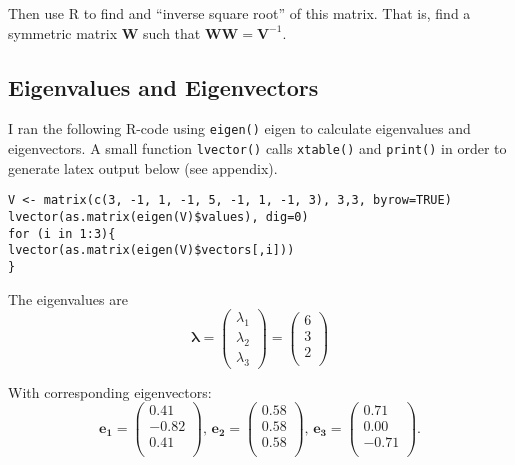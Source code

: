 \documentclass[11pt]{article}
\begin{document}
Then use R to find and ``inverse square root'' of this matrix.
That is, find a symmetric matrix $\mathbf{W}$ such that
$\mathbf{WW}=\mathbf{V}^{-1}$.
\subsection{Eigenvalues and Eigenvectors}
\label{sec-2-1}


I ran the following R-code using \verb~eigen()~ eigen to calculate eigenvalues
and eigenvectors. A small function \verb~lvector()~ calls \verb~xtable()~ and \verb~print()~
in order to generate latex output below (see appendix). 

\begin{verbatim}
V <- matrix(c(3, -1, 1, -1, 5, -1, 1, -1, 3), 3,3, byrow=TRUE)
lvector(as.matrix(eigen(V)$values), dig=0)
for (i in 1:3){
lvector(as.matrix(eigen(V)$vectors[,i]))
}
\end{verbatim}

The eigenvalues are 
\[
\mathbf{\lambda} = \begin{pmatrix} \lambda_1
\\ \lambda_2 \\ \lambda_3 \end{pmatrix} =
\begin{pmatrix}{}
    6 \\ 
    3 \\ 
    2 \\ 
  \end{pmatrix}
\]

With corresponding eigenvectors:
\[
\mathbf{e_1} = 
\begin{pmatrix}{}
  0.41 \\ 
  -0.82 \\ 
  0.41 \\ 
  \end{pmatrix},\,
\mathbf{e_2} =
\begin{pmatrix}{}
  0.58 \\ 
  0.58 \\ 
  0.58 \\ 
  \end{pmatrix},\,
\mathbf{e_3} =
\begin{pmatrix}{}
  0.71 \\ 
  0.00 \\ 
  -0.71 \\ 
  \end{pmatrix}.
\]
\end{document}
